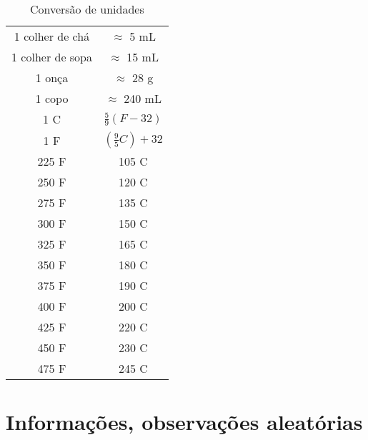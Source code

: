 \begin{table}[h]
	\centering
	\begin{tabular}[h]{c c}
		\hline
		1 colher de chá  & $\approx$ 5 mL                    \\
		1 colher de sopa & $\approx$ 15 mL                   \\
		1 onça           & $\approx$ 28 g                    \\
		1 copo           & $\approx$ 240 mL                  \\
		\hline
		1 \grau C        & $\frac{5}{9} \left( F-32 \right)$ \\
		1 \grau F        & $\left(\frac{9}{5} C\right)+32$   \\
		\hline
		225 \grau F      & 105 \grau C                       \\
		250 \grau F      & 120 \grau C                       \\
		275 \grau F      & 135 \grau C                       \\
		300 \grau F      & 150 \grau C                       \\
		325 \grau F      & 165 \grau C                       \\
		350 \grau F      & 180 \grau C                       \\
		375 \grau F      & 190 \grau C                       \\
		400 \grau F      & 200 \grau C                       \\
		425 \grau F      & 220 \grau C                       \\
		450 \grau F      & 230 \grau C                       \\
		475 \grau F      & 245 \grau C                       \\
		\hline
	\end{tabular}
	\caption{Conversão de unidades}
	\label{tab:conversao_unidades}
\end{table}

\section{Informações, observações aleatórias}

